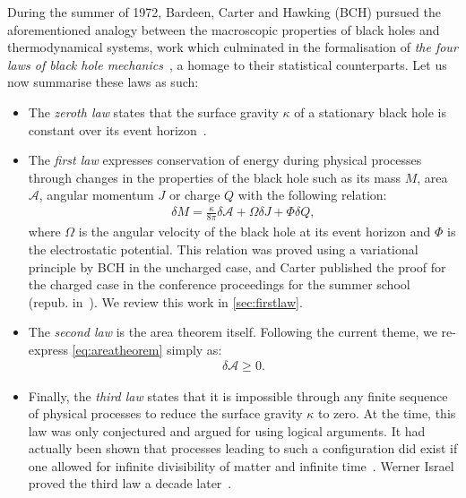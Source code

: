 \documentclass[
twoside,
openright,
frontopenright,
]{dmathesis}
\begin{document}
During the summer of 1972, Bardeen, Carter and Hawking (BCH) pursued the
aforementioned analogy between the macroscopic properties of black holes and
thermodynamical systems, work which culminated in the formalisation of \emph{the
  four laws of black hole mechanics}~\cite{Bardeen:1973gs}, a homage to their
statistical counterparts. Let us now summarise these laws as such:
\begin{itemize}
\item The \emph{zeroth law} states that the surface gravity $\kappa$ of a
  stationary black hole is constant over its event
  horizon~\cite{Bardeen:1973gs,Hawking:1973qla,Carter:1973rla,Carter2009,
    Carter2010}.
\item The \emph{first law} expresses conservation of energy during physical
  processes through changes in the properties of the black hole such as its mass
  $M$, area $\mathcal{A}$, angular momentum $J$ or charge $Q$ with the following
  relation:
  \begin{align}
    \label{eq:firstlawBHM}
    \delta M = \frac{\kappa}{8\pi} \delta \mathcal{A} + \Omega \delta J + \Phi
    \delta Q, 
  \end{align}
  where $\Omega$ is the angular velocity of the black hole at its event horizon
  and $\Phi$ is the electrostatic potential. This relation was proved using a
  variational principle by BCH in the uncharged case, and Carter published the
  proof for the charged case in the conference proceedings for the summer
  school~\cite{Carter:1973rla} (repub. in~\cite{Carter2010}). We review this
  work in \cref{sec:firstlaw}.
\item The \emph{second law} is the area theorem itself. Following the current
  theme, we re-express \cref{eq:areatheorem} simply as:
  \begin{align}
    \label{eq:secondlaw}
    \delta\mathcal{A}\geqslant 0.
  \end{align}
\item Finally, the \emph{third law} states that it is impossible through any
  finite sequence of physical processes to reduce the surface gravity $\kappa$
  to zero. At the time, this law was only conjectured and argued for using
  logical arguments. It had actually been shown that processes leading to such a
  configuration did exist if one allowed for infinite divisibility of matter and
  infinite time~\cite{Christodoulou:1970wf,Bardeen:1970zz}. Werner Israel proved
  the third law a decade later~\cite{Israel:1986gqz}.
\end{itemize} 
\end{document}
